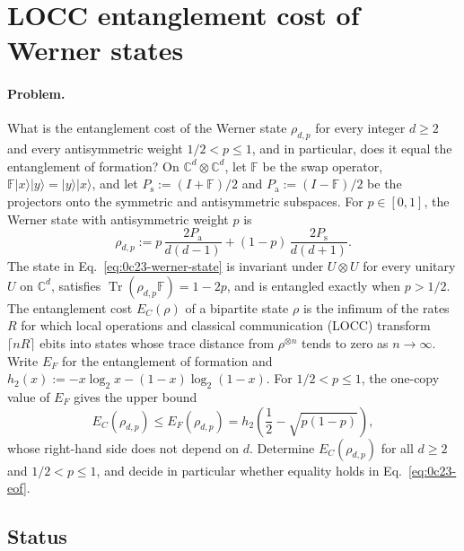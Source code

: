 \section{LOCC entanglement cost of Werner states}
\label{sec:op_0c23167deb384894}

\paragraph{Problem.}
What is the entanglement cost of the Werner state $\rho_{d,p}$ for every
integer $d\geq2$ and every antisymmetric weight $1/2<p\leq1$, and in
particular, does it equal the entanglement of formation?  On
$\mathbb C^d\otimes\mathbb C^d$, let $\mathbb F$ be the swap operator,
$\mathbb F\lvert x\rangle\lvert y\rangle=\lvert y\rangle\lvert x\rangle$, and
let $P_{\mathrm s}:=(I+\mathbb F)/2$ and $P_{\mathrm a}:=(I-\mathbb F)/2$ be the
projectors onto the symmetric and antisymmetric subspaces.  For $p\in[0,1]$,
the Werner state with antisymmetric weight $p$ is
\begin{equation}
  \rho_{d,p}:=p\,\frac{2P_{\mathrm a}}{d(d-1)}
    +(1-p)\,\frac{2P_{\mathrm s}}{d(d+1)}.
  \label{eq:0c23-werner-state}
\end{equation}
The state in Eq.~\eqref{eq:0c23-werner-state} is invariant under $U\otimes U$
for every unitary $U$ on $\mathbb C^d$, satisfies
$\operatorname{Tr}(\rho_{d,p}\mathbb F)=1-2p$, and is entangled exactly when
$p>1/2$.  The entanglement cost $E_C(\rho)$ of a bipartite state $\rho$ is the
infimum of the rates $R$ for which local operations and classical
communication (LOCC) transform $\lceil nR\rceil$ ebits into states whose trace
distance from $\rho^{\otimes n}$ tends to zero as $n\to\infty$.  Write $E_F$
for the entanglement of formation and
$h_2(x):=-x\log_2x-(1-x)\log_2(1-x)$.  For $1/2<p\leq1$, the one-copy value of
$E_F$ gives the upper bound
\begin{equation}
  E_C(\rho_{d,p})\leq E_F(\rho_{d,p})
  =h_2\!\left(\frac12-\sqrt{p(1-p)}\right),
  \label{eq:0c23-eof}
\end{equation}
whose right-hand side does not depend on $d$.  Determine $E_C(\rho_{d,p})$
for all $d\geq2$ and $1/2<p\leq1$, and decide in particular whether equality
holds in Eq.~\eqref{eq:0c23-eof}.

\subsection*{Status}

